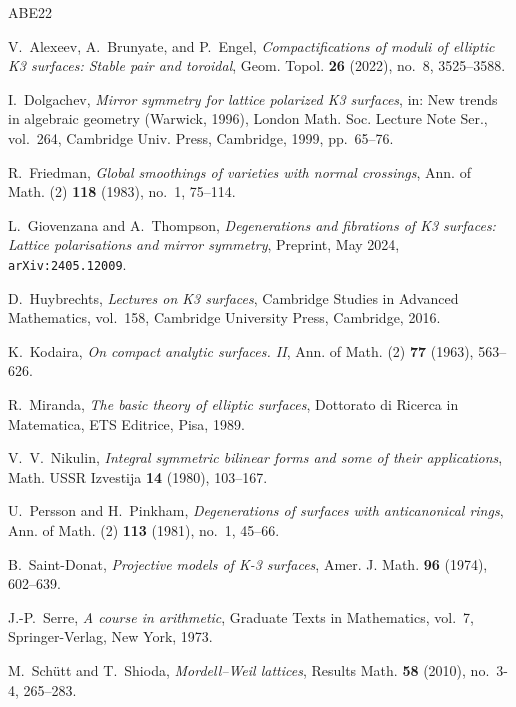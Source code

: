 \documentclass[11pt]{amsart}
\theoremstyle{plain}
\theoremstyle{definition}
\theoremstyle{remark}
\numberwithin{equation}{section}
\begin{document}
\begin{thebibliography}{ABE22}

 V.~Alexeev, A.~Brunyate, and P.~Engel,
\emph{Compactifications of moduli of elliptic {K3} surfaces: Stable pair and
toroidal}, Geom. Topol. \textbf{26} (2022), no.~8, 3525--3588.

 I.~Dolgachev,
\emph{Mirror symmetry for lattice polarized {K3} surfaces}, in: New trends in
algebraic geometry (Warwick, 1996), London Math. Soc. Lecture Note Ser.,
vol.~264, Cambridge Univ. Press, Cambridge, 1999, pp.~65--76.

 R.~Friedman,
\emph{Global smoothings of varieties with normal crossings}, Ann. of Math.
(2) \textbf{118} (1983), no.~1, 75--114.

 L.~Giovenzana and A.~Thompson,
\emph{Degenerations and fibrations of {K3} surfaces: Lattice polarisations
and mirror symmetry}, Preprint, May 2024, \texttt{arXiv:2405.12009}.

 D.~Huybrechts,
\emph{Lectures on {K3} surfaces}, Cambridge Studies in Advanced Mathematics,
vol.~158, Cambridge University Press, Cambridge, 2016.

 K.~Kodaira,
\emph{On compact analytic surfaces. {II}}, Ann. of Math. (2) \textbf{77}
(1963), 563--626.

 R.~Miranda,
\emph{The basic theory of elliptic surfaces}, Dottorato di Ricerca in
Matematica, ETS Editrice, Pisa, 1989.

 V.~V.~Nikulin,
\emph{Integral symmetric bilinear forms and some of their applications},
Math. USSR Izvestija \textbf{14} (1980), 103--167.

 U.~Persson and H.~Pinkham,
\emph{Degenerations of surfaces with anticanonical rings}, Ann. of Math. (2)
\textbf{113} (1981), no.~1, 45--66.

 B.~Saint-Donat,
\emph{Projective models of {K-3} surfaces}, Amer. J. Math. \textbf{96}
(1974), 602--639.

 J.-P.~Serre,
\emph{A course in arithmetic}, Graduate Texts in Mathematics, vol.~7,
Springer-Verlag, New York, 1973.

 M.~Sch\"utt and T.~Shioda,
\emph{Mordell--{W}eil lattices}, Results Math. \textbf{58} (2010), no.~3-4,
265--283.

\end{thebibliography}
\end{document}
